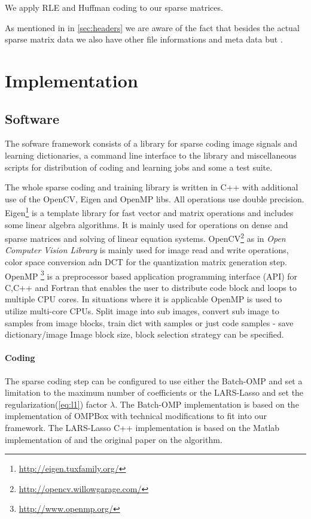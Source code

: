 We apply RLE and Huffman coding to our sparse matrices. 


As mentioned in in \ref{sec:headers} we are aware of the fact that besides
the actual sparse matrix data we also have other file informations and meta
data but .  



\section{Implementation}
\subsection*{Software}
The sofware framework consists of a library for sparse coding image signals 
and learning dictionaries, a command line interface to the library and
miscellaneous scripts for distribution of coding and learning jobs and
some a test suite.

The whole sparse coding and training library is written in C++ with
additional use of the OpenCV, Eigen and OpenMP libs. All operations use double
precision. Eigen\footnote{\url{http://eigen.tuxfamily.org/}\cite{Eigen}}
is a template library for fast vector and matrix operations 
and includes some linear algebra algorithms. It is mainly used for operations on
dense and sparse matrices and solving of linear equation
systems. OpenCV\footnote{\url{http://opencv.willowgarage.com/}\cite{OpenCV}} as
in \emph{Open Computer Vision Library} is mainly used for
image read and write operations, color space conversion adn DCT for the
quantization matrix generation step. OpenMP
\footnote{\url{http://www.openmp.org/}\cite{OpenMP}} is a preprocessor
based application programming interface (API) for C,C++ and Fortran that enables
the user to distribute code block and loops to multiple CPU cores. In situations
where it is applicable OpenMP is used to utilize multi-core CPUs. 
Split image into sub images, convert sub image to samples from image blocks, 
train dict with samples or just code samples - save dictionary/image
Image block size, block selection strategy can be specified.

\paragraph{Coding}
The sparse coding step can be configured to use either the Batch-OMP and 
set a limitation to the maximum number of coefficients or the LARS-Lasso 
and set the regularization(\ref{eq:l1}) factor $\lambda$.
The Batch-OMP implementation is based on the implementation
of \cite{Rubinstein} OMPBox with technical modifications to fit into our
framework. The LARS-Lasso C++ implementation is based on the Matlab
implementation of\cite{Strand2005} and the original
paper\cite{Efron2004} on the algorithm.

